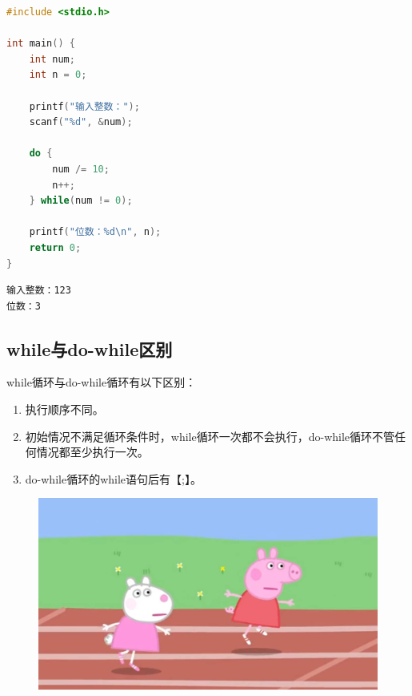 \begin{lstlisting}[language=C]
#include <stdio.h>

int main() {
    int num;
    int n = 0;

    printf("输入整数：");
    scanf("%d", &num);

    do {
        num /= 10;
        n++;
    } while(num != 0);

    printf("位数：%d\n", n);
    return 0;
}
\end{lstlisting}

\begin{tcolorbox}
	\begin{verbatim}
输入整数：123
位数：3
\end{verbatim}
\end{tcolorbox}

\vspace{0.5cm}

\subsection{while与do-while区别}

while循环与do-while循环有以下区别：

\begin{enumerate}
	\item 执行顺序不同。

	\item 初始情况不满足循环条件时，while循环一次都不会执行，do-while循环不管任何情况都至少执行一次。

	\item do-while循环的while语句后有【;】。
\end{enumerate}

\begin{figure}[H]
	\centering
	\includegraphics[scale=0.15]{img/C4/4-3/1.png}
\end{figure}

